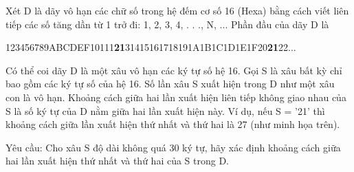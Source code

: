 Xét D là dãy vô hạn các chữ số trong hệ đếm cơ số 16 (Hexa) bằng cách viết liên tiếp các số tăng dần từ 1 trở đi: 1, 2, 3, 4, . . ., N, ... Phần đầu của dãy D là

123456789ABCDEF10111\textbf{21}31415161718191A1B1C1D1E1F20\textbf{21}22...

Có thể coi dãy D là một xâu vô hạn các ký tự số hệ 16. Gọi S là xâu bất kỳ chỉ bao gồm các ký tự số của hệ 16. Số lần xâu S xuất hiện trong D như một xâu con là vô hạn. Khoảng cách giữa hai lần xuất hiện liên tiếp không giao nhau của S là số ký tự của D nằm giữa hai lần xuất hiện này. Ví dụ, nếu S = ’21’ thì khoảng cách giữa lần xuất hiện thứ nhất và thứ hai là 27 (như minh họa trên).

Yêu cầu: Cho xâu S độ dài không quá 30 ký tự, hãy xác định khoảng cách giữa hai lần xuất hiện thứ nhất và thứ hai của S trong D.

\